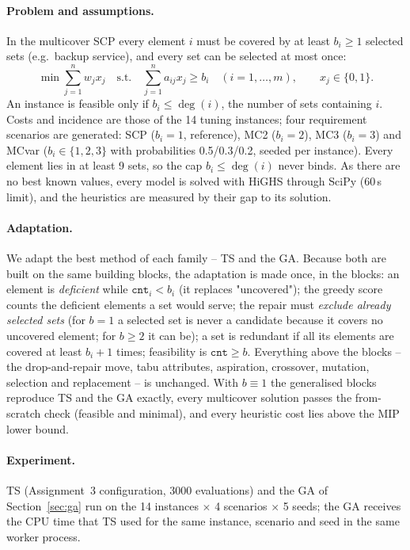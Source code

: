 \documentclass[11pt,a4paper]{article}
\begin{document}
\paragraph{Problem and assumptions.} In the multicover SCP every element $i$ must be covered by at least $b_i\ge1$ selected sets (e.g.\ backup service), and every set can be selected at most once:
\begin{equation}
\min \sum_{j=1}^{n} w_j x_j \quad \text{s.t.}\quad \sum_{j=1}^{n} a_{ij}x_j \ge b_i \quad (i=1,\dots,m), \qquad x_j\in\{0,1\}.
\end{equation}
An instance is feasible only if $b_i\le\deg(i)$, the number of sets containing $i$. Costs and incidence are those of the 14 tuning instances; four requirement scenarios are generated: \textsf{SCP} ($b_i=1$, reference), \textsf{MC2} ($b_i=2$), \textsf{MC3} ($b_i=3$) and \textsf{MCvar} ($b_i\in\{1,2,3\}$ with probabilities 0.5/0.3/0.2, seeded per instance). Every element lies in at least 9 sets, so the cap $b_i\le\deg(i)$ never binds.
As there are no best known values, every model is solved with HiGHS \cite{huangfu2018} through SciPy \cite{virtanen2020} (60\,s limit), and the heuristics are measured by their gap to its solution.

\paragraph{Adaptation.} We adapt the best method of each family -- TS and the GA. Because both are built on the same building blocks, the adaptation is made once, in the blocks:
an element is \emph{deficient} while $\texttt{cnt}_i<b_i$ (it replaces "uncovered"); the greedy score counts the deficient elements a set would serve; the repair must \emph{exclude already selected sets} (for $b=1$ a selected set is never a candidate because it covers no uncovered element; for $b\ge2$ it can be); a set is redundant if all its elements are covered at least $b_i+1$ times; feasibility is $\texttt{cnt}\ge b$.
Everything above the blocks -- the drop-and-repair move, tabu attributes, aspiration, crossover, mutation, selection and replacement -- is unchanged. With $b\equiv1$ the generalised blocks reproduce TS and the GA exactly, every multicover solution passes the from-scratch check (feasible and minimal), and every heuristic cost lies above the MIP lower bound.

\paragraph{Experiment.} TS (Assignment~3 configuration, 3000 evaluations) and the GA of Section~\ref{sec:ga} run on the 14 instances $\times$ 4 scenarios $\times$ 5 seeds; the GA receives the CPU time that TS used for the same instance, scenario and seed in the same worker process.
\end{document}
